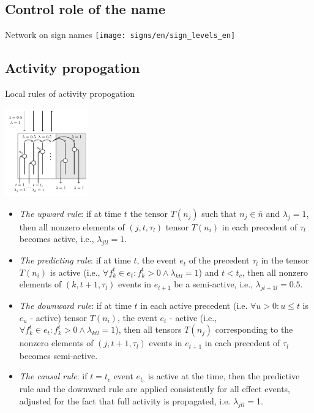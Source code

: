 \documentclass[default]{beamer}
\begin{document}
	\subsection{Control role of the name}
	\begin{frame}{Network on sign names}
		\centering
		\texttt{[image: signs/en/sign\_levels\_en]}
		
		\nocite{*}
		\printbibliography[keyword={swm}, resetnumbers=true]
	\end{frame}	

	\subsection{Activity propogation}
	\begin{frame}{Local rules of activity propogation} 
		\scriptsize                            
		\begin{center}
			\includegraphics[width=0.27\textwidth]{causnet/caus_active}
		\end{center}

		\begin{itemize}
			\item \textit{The upward rule}: if at time $t$ the tensor $T({{n}_{j}})$ such that ${{n}_{j}}\in \bar{n}$ and ${{\lambda }_{j}}=1$, then all nonzero elements of $(j,t,{{\tau }_{l}})$ tensor $T({{n}_{i}})$ in each precedent of ${{\tau }_{l}}$ becomes active, i.e., ${{\lambda }_{jtl}}=1$.
			\item \textit{The predicting rule}: if at time $t$, the event ${{e}_{t}}$ of the precedent ${{\tau }_{l}}$ in the tensor $T({{n}_{i}})$ is active (i.e., $\forall f_{k}^{t}\in {{e}_{t}}:f_{k}^{t}>0\wedge {{\lambda }_{ktl}}=1$) and $t<{{t}_{c}}$, then all nonzero elements of $(k,t+1,{{\tau }_{l}})$ events in ${{e}_{t+1}}$ be a semi-active, i.e., ${{\lambda }_{jt+1l}}=0.5$.
			\item \textit{The downward rule}: if at time $t$ in each active precedent (i.e. $\forall u>0:u\le t$ is ${{e}_{u}}$ - active) tensor $T({{n}_{i}})$, the event ${{e}_{t}}$ - active (i.e., $\forall f_{k}^{t}\in {{e}_{t}}:f_{k}^{t}>0\wedge {{\lambda }_{ktl}}=1$), then all tensors $T({{n}_{j}})$ corresponding to the nonzero elements of $(j,t+1,{{\tau }_{l}})$ events in ${{e}_{t+1}}$ in each precedent of ${{\tau }_{l}}$ becomes semi-active.
			\item \textit{The causal rule}: if $t={{t}_{c}}$ event ${{e}_{{{t}_{c}}}}$ is active at the time, then the predictive rule and the downward rule are applied consistently for all effect events, adjusted for the fact that full activity is propagated, i.e. ${{\lambda }_{jtl}}=$1.
		\end{itemize}
		\vspace{-5pt}
		\nocite{*}
		\printbibliography[keyword={per}, resetnumbers=true]
	\end{frame}
\end{document}
